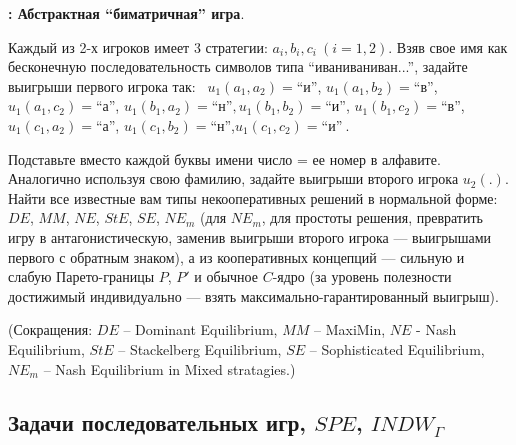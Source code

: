 \documentclass[a4paper,12pt]{article}
\begin{document}
\begin{exmp}
{\bf : Абстрактная ``биматричная'' игра}. {\rm Каждый из
2-х игроков имеет 3 стратегии: $a_i, b_i, c_i~ (i=1,2)$.
Взяв свое имя как бесконечную последовательность символов
типа ``иваниваниван...'', задайте выигрыши первого игрока
так:~ $u_1(a_1,a_{2}) = $``и'', $ u_1(a_1,b_{2}) = $``в'',$
u_1(a_1,c_{2}) = $``а'', $ u_1(b_1,a_{2}) = $``н''$,
u_1(b_1,b_{2}) = $``и'', $ u_1(b_1,c_{2}) = $``в'',$
u_1(c_1,a_{2}) = $``а'', $ u_1(c_1,b_{2}) = $``н'',$
u_1(c_1,c_{2}) = $``и''$~ $.

Подставьте вместо каждой буквы имени число = ее номер в
алфавите. Аналогично используя свою фамилию, задайте
выигрыши второго игрока $u_2(.)$. Найти все известные вам
типы некооперативных решений в нормальной форме: $DE$,
$MM$, $NE$, $StE$, $SE$, $NE_m$ (для $NE_m$, для простоты
решения, превратить игру в антагонистическую, заменив
выигрыши второго игрока — выигрышами первого с обратным
знаком), а из кооперативных концепций — сильную и слабую
Парето-границы $P$, $P'$ и обычное $C$-ядро (за уровень
полезности достижимый индивидуально
--- взять максимально-гарантированный выигрыш).

(Сокращения: $DE$ -- Dominant Equilibrium, $MM$ -- MaxiMin,
$NE$ - Nash Equilibrium, $StE$ -- Stackelberg Equilibrium,
$SE$ -- Sophisticated Equilibrium, $NE_m$ -- Nash
Equilibrium in Mixed stratagies.) }\end{exmp}


\subsection{Задачи последовательных игр, $SPE$, $INDW_{\Gamma}$}
\end{document}
